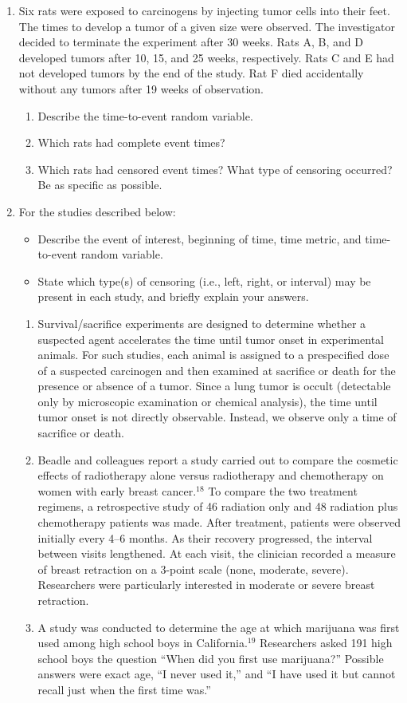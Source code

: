 \documentclass[
]{book}
\begin{document}
\begin{enumerate}
  \item Six rats were exposed to carcinogens by injecting tumor cells into their feet. The times to develop a tumor of a given size were observed. The investigator decided to terminate the experiment after 30 weeks. Rats A, B, and D developed tumors after 10, 15, and 25 weeks, respectively. Rats C and E had not developed tumors by the end of the study. Rat F died accidentally without any tumors after 19 weeks of observation.
  \begin{enumerate}
    \item Describe the time-to-event random variable.
    \item Which rats had complete event times?
    \item Which rats had censored event times? What type of censoring occurred? Be as specific as possible.
  \end{enumerate}

  \item For the studies described below:
  \begin{itemize}
    \item Describe the event of interest, beginning of time, time metric, and time-to-event random variable.
    \item State which type(s) of censoring (i.e., left, right, or interval) may be present in each study, and briefly explain your answers.
  \end{itemize}
  \begin{enumerate}
    \item Survival/sacrifice experiments are designed to determine whether a suspected agent accelerates the time until tumor onset in experimental animals. For such studies, each animal is assigned to a prespecified dose of a suspected carcinogen and then examined at sacrifice or death for the presence or absence of a tumor. Since a lung tumor is occult (detectable only by microscopic examination or chemical analysis), the time until tumor onset is not directly observable. Instead, we observe only a time of sacrifice or death.
    \item Beadle and colleagues report a study carried out to compare the cosmetic effects of radiotherapy alone versus radiotherapy and chemotherapy on women with early breast cancer.$^{18}$ To compare the two treatment regimens, a retrospective study of 46 radiation only and 48 radiation plus chemotherapy patients was made. After treatment, patients were observed initially every 4–6 months. As their recovery progressed, the interval between visits lengthened. At each visit, the clinician recorded a measure of breast retraction on a 3-point scale (none, moderate, severe). Researchers were particularly interested in moderate or severe breast retraction.
    \item A study was conducted to determine the age at which marijuana was first used among high school boys in California.$^{19}$ Researchers asked 191 high school boys the question ``When did you first use marijuana?'' Possible answers were exact age, ``I never used it,'' and ``I have used it but cannot recall just when the first time was.''
  \end{enumerate}


\end{enumerate}
\end{document}
